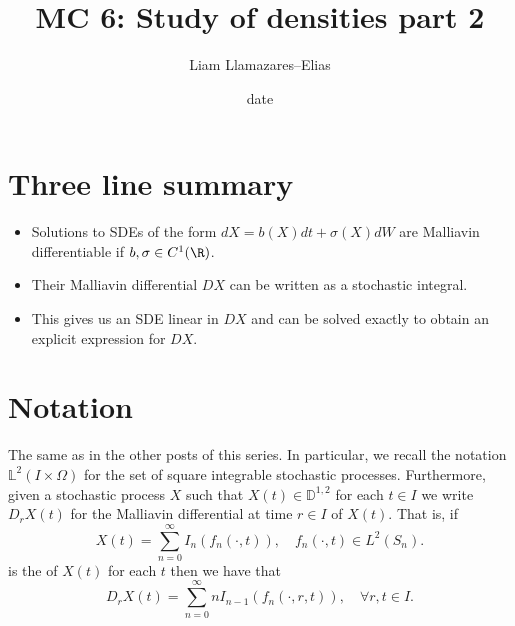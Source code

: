 \documentclass[
    a4paper,
    DIV=14,
    abstract=true,
    numbers=noenddot
]{scrartcl}
\begin{document}
\title{MC 6: Study of densities part 2}
\author{Liam Llamazares--Elias}
\date{date}
\maketitle
\section{ Three line summary}
\begin{itemize}
	\item Solutions to SDEs of the form $dX=b(X) d t +\sigma (X)dW $ are Malliavin differentiable if $b,\sigma \in C^1(\R)$.
	\item Their Malliavin differential $DX$ can be written as a stochastic integral.
	\item This gives us an SDE linear in $DX$ and can be solved exactly to obtain an explicit expression for  $DX$.
\end{itemize}
\section{Notation}
The same as in the other posts of this series. In particular, we recall the notation $\mathbb{L}^2(I\times\Omega)$ for the set of   square integrable stochastic processes. Furthermore, given a stochastic process $X$ such that  $X(t)\in \mathbb{D}^{1,2}$ for each $t\in I$ we write $D_rX(t)$ for the Malliavin differential at  time $r\in I$ of $X(t)$. That is, if
\begin{equation}\label{ce}
	X(t)=\sum_{n=0}^{\infty}  I_n(f_n(\cdot ,t)),\quad f_n(\cdot ,t)\in L^2(S_n).
\end{equation}
is the   of $X(t)$ for each  $t$ then we have that
\begin{equation}\label{ced}
	D_rX(t)=\sum_{n=0}^{\infty}  nI_{n-1}(f_n(\cdot ,r,t)) , \quad\forall r,t\in I.
\end{equation}
\end{document}
